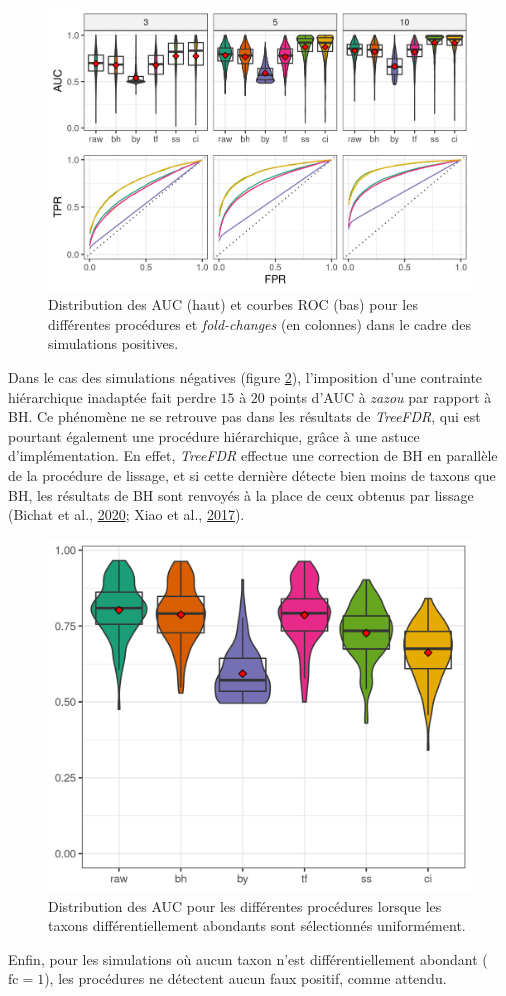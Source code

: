 \documentclass[12pt,a4paper]{reedthesis}
\theoremstyle{definition}
\theoremstyle{definition}
\theoremstyle{definition}
\theoremstyle{remark}
\begin{document}
\begin{figure}[!t]

{\centering \includegraphics[width=0.9\linewidth]{img/aucroc_zazou} 

}

\caption{Distribution des AUC (haut) et courbes ROC (bas) pour les différentes procédures et \emph{fold-changes} (en colonnes) dans le cadre des simulations positives.}\label{fig:aucroczazou}
\end{figure}
Dans le cas des simulations négatives (figure \ref{fig:aucnegzazou}), l'imposition d'une contrainte hiérarchique inadaptée fait perdre \(15\) à \(20\) points d'AUC à \emph{zazou} par rapport à BH. Ce phénomène ne se retrouve pas dans les résultats de \emph{TreeFDR}, qui est pourtant également une procédure hiérarchique, grâce à une astuce d'implémentation. En effet, \emph{TreeFDR} effectue une correction de BH en parallèle de la procédure de lissage, et si cette dernière détecte bien moins de taxons que BH, les résultats de BH sont renvoyés à la place de ceux obtenus par lissage (Bichat et al., \protect\hyperlink{ref-bichat2020incorporating}{2020}; Xiao et al., \protect\hyperlink{ref-xiao2017false}{2017}).


\begin{figure}[!t]

{\centering \includegraphics[width=0.4\linewidth]{img/aucneg_zazou} 

}

\caption{Distribution des AUC pour les différentes procédures lorsque les taxons différentiellement abondants sont sélectionnés uniformément.}\label{fig:aucnegzazou}
\end{figure}
Enfin, pour les simulations où aucun taxon n'est différentiellement abondant (\(\text{fc} = 1\)), les procédures ne détectent aucun faux positif, comme attendu.
\end{document}
